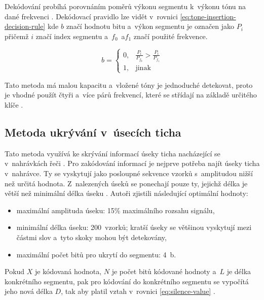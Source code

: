 Dekódování probíhá porovnáním poměrů výkonu segmentu k~výkonu tónu na dané
frekvenci \cite{Djebbar2012}. Dekódovací pravidlo lze vidět v~rovnici
\ref{eq:tone-insertion-decision-rule} kde $b$ značí hodnotu bitu a~výkon
segmentu je označen jako $P_i$ přičemž $i$ značí index segmentu a~$f_0$~a$f_1$
značí použité frekvence.

\begin{equation}
    \label{eq:tone-insertion-decision-rule}
    b = \left\{
        \begin{array}{rl}
            0, & \frac{P_i}{P_{f_0}} > \frac{P_i}{P_{f_1}} \\
            1, & \mathrm{jinak}
        \end{array}
    \right.
\end{equation}

Tato metoda má malou kapacitu a~vložené tóny je jednoduché detekovat, proto je
vhodné použít čtyři a~více párů frekvencí, které se střídají na základě
určitého klíče \cite{Djebbar2012}.

\subsection*{Metoda ukrývání v~úsecích ticha}
\label{sub:hinding-in-silence-intervals}

Tato metoda využívá ke skrývání informací úseky ticha nacházející se
v~nahrávkách řeči \cite{Djebbar2012}. Pro zakódování informací je nejprve
potřeba najít úseky ticha v~nahrávce. Ty se vyskytují jako posloupné sekvence
vzorků s~amplitudou nižší než určitá hodnota. Z~nalezených úseků se ponechají
pouze ty, jejichž délka je větší než minimální délka úseku \cite{Shahreza2008}.
Autoři \cite{Shahreza2008} zjistili následující optimální hodnoty:

\begin{itemize}
    \item maximální amplituda úseku: 15\% maximálního rozsahu signálu,
    \item minimální délka úseku: 200~vzorků; kratší úseky se většinou vyskytují
        mezi částmi slov a~tyto skoky mohou být detekovány,
    \item maximální počet bitů pro ukrytí do segmentu: 4~b.
\end{itemize}

Pokud $X$ je kódovaná hodnota, $N$ je počet bitů kódované hodnoty a~$L$ je
délka konkrétního segmentu, pak pro kódování do konkrétního segmentu se
vypočítá jeho nová délka $D$, tak aby platil vztah v~rovnici
\ref{eq:silence-value} \cite{Shahreza2008}.

